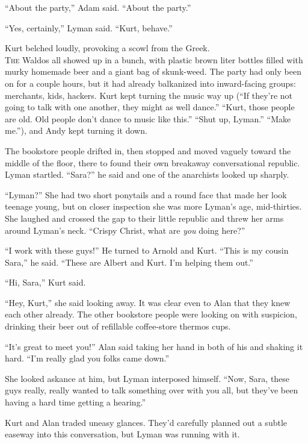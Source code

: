 \documentclass{article}
\begin{document}
``About the party,'' Adam said.  ``About the party.''

``Yes, certainly,'' Lyman said.  ``Kurt, behave.''

Kurt belched loudly, provoking a scowl from the Greek.
\\
\lettrine[lines=3, lhang=.5, nindent=0pt, findent=2pt]{T}{he} Waldos all showed up in a bunch, with plastic brown liter bottles
filled with murky homemade beer and a giant bag of skunk-weed.  The
party had only been on for a couple hours, but it had already
balkanized into inward-facing groups:  merchants, kids, hackers.  Kurt
kept turning the music way up (``If they're not going to talk with one
another, they might as well dance.'' ``Kurt, those people are old. 
Old people don't dance to music like this.'' ``Shut up, Lyman.''
``Make me.''), and Andy kept turning it down.

The bookstore people drifted in, then stopped and moved vaguely toward
the middle of the floor, there to found their own breakaway
conversational republic.  Lyman startled.  ``Sara?'' he said and one
of the anarchists looked up sharply.

``Lyman?'' She had two short ponytails and a round face that made her
look teenage young, but on closer inspection she was more Lyman's age,
mid-thirties.  She laughed and crossed the gap to their little
republic and threw her arms around Lyman's neck.  ``Crispy Christ,
what are \textit{you} doing here?''

``I work with these guys!'' He turned to Arnold and Kurt.  ``This is
my cousin Sara,'' he said.  ``These are Albert and Kurt.  I'm helping
them out.''

``Hi, Sara,'' Kurt said.

``Hey, Kurt,'' she said looking away.  It was clear even to Alan that
they knew each other already.  The other bookstore people were looking
on with suspicion, drinking their beer out of refillable coffee-store
thermos cups.

``It's great to meet you!'' Alan said taking her hand in both of his
and shaking it hard.  ``I'm really glad you folks came down.''

She looked askance at him, but Lyman interposed himself.  ``Now, Sara,
these guys really, really wanted to talk something over with you all,
but they've been having a hard time getting a hearing.''

Kurt and Alan traded uneasy glances.  They'd carefully planned out a
subtle easeway into this conversation, but Lyman was running with it.
\end{document}
